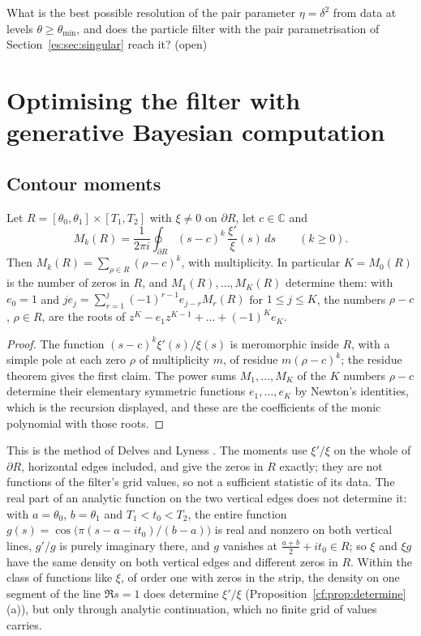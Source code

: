 \begin{problem}\label{cf:op:pairres}
What is the best possible resolution of the pair parameter $\eta=\delta^2$ from data at levels $\theta\ge\theta_{\min}$, and does the particle filter with the pair parametrisation of Section~\ref{es:sec:singular} reach it? (open)
\end{problem}

\section{Optimising the filter with generative Bayesian computation}\label{cf:sec:gbc}

\subsection{Contour moments}\label{cf:sec:moments}

\begin{proposition}\label{cf:prop:moments}
Let $R=[\theta_0,\theta_1]\times[T_1,T_2]$ with $\xi\ne0$ on $\partial R$, let $c\in\mathbb C$ and
\[
M_k(R)=\frac1{2\pi i}\oint_{\partial R}(s-c)^k\,\frac{\xi'}{\xi}(s)\,ds\qquad(k\ge0).
\]
Then $M_k(R)=\sum_{\rho\in R}(\rho-c)^k$, with multiplicity. In particular $K=M_0(R)$ is the number of zeros in $R$, and $M_1(R),\dots,M_K(R)$ determine them: with $e_0=1$ and $je_j=\sum_{r=1}^j(-1)^{r-1}e_{j-r}M_r(R)$ for $1\le j\le K$, the numbers $\rho-c$, $\rho\in R$, are the roots of $z^K-e_1z^{K-1}+\dots+(-1)^Ke_K$.
\end{proposition}

\begin{proof}
The function $(s-c)^k\xi'(s)/\xi(s)$ is meromorphic inside $R$, with a simple pole at each zero $\rho$ of multiplicity $m$, of residue $m(\rho-c)^k$; the residue theorem gives the first claim. The power sums $M_1,\dots,M_K$ of the $K$ numbers $\rho-c$ determine their elementary symmetric functions $e_1,\dots,e_K$ by Newton's identities, which is the recursion displayed, and these are the coefficients of the monic polynomial with those roots.
\end{proof}

\begin{remark}
This is the method of Delves and Lyness \cite{DL67}. The moments use $\xi'/\xi$ on the whole of $\partial R$, horizontal edges included, and give the zeros in $R$ exactly; they are not functions of the filter's grid values, so not a sufficient statistic of its data. The real part of an analytic function on the two vertical edges does not determine it: with $a=\theta_0$, $b=\theta_1$ and $T_1<t_0<T_2$, the entire function $g(s)=\cos\bigl(\pi(s-a-it_0)/(b-a)\bigr)$ is real and nonzero on both vertical lines, $g'/g$ is purely imaginary there, and $g$ vanishes at $\frac{a+b}2+it_0\in R$; so $\xi$ and $\xi g$ have the same density on both vertical edges and different zeros in $R$. Within the class of functions like $\xi$, of order one with zeros in the strip, the density on one segment of the line $\Re s=1$ does determine $\xi'/\xi$ (Proposition~\ref{cf:prop:determine}(a)), but only through analytic continuation, which no finite grid of values carries.
\end{remark}

